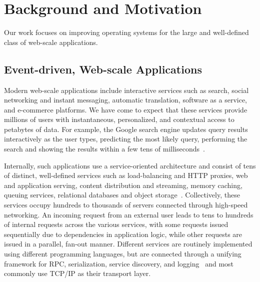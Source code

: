 
\section{Background and Motivation}
\label{sec:motivation}

Our work focuses on improving operating systems for the large and
well-defined class of web-scale applications. 


\subsection{Event-driven, Web-scale Applications}
\label{sec:motivation:web}

Modern web-scale applications include interactive services such as
search, social networking and instant messaging, automatic
translation, software as a service, and e-commerce platforms.
We have come to expect that these services provide millions of users
with instantaneous, personalized, and contextual access to petabytes
of data.  For example, the Google search engine updates query results
interactively as the user types, predicting the most likely query,
performing the search and showing the results within a few tens of
milliseconds~\cite{DBLP:journals/cacm/DeanB13}.

Internally, such applications use a service-oriented architecture and
consist of tens of distinct, well-defined services such as
load-balancing and HTTP proxies, web and application serving, content
distribution and streaming, memory caching, queuing services,
relational databases and object
storage~\cite{DBLP:conf/sosp/DeCandiaHJKLPSVV07,Alonso:2010:WSC,Eriksen:2013:YSF}.
Collectively, these services occupy hundreds to thousands of servers
connected through high-speed networking. An incoming request from an
external user leads to tens to hundreds of internal requests across
the various services, with some requests issued sequentially due to
dependencies in application logic, while other requests are issued in
a parallel, fan-out manner.  Different services are routinely
implemented using different programming languages, but are connected
through a unifying framework for RPC, serialization, service
discovery, and logging~\cite{protocolbuffers, thrift,
  finagle} and most commonly use TCP/IP as their transport
layer.

